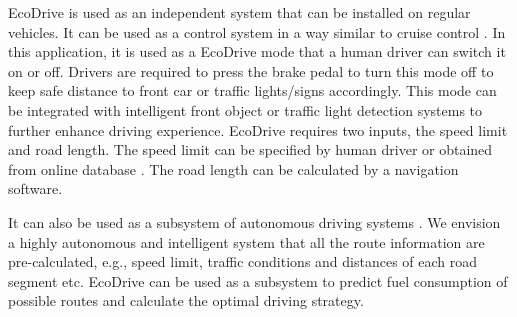 EcoDrive is used as an independent system that can be installed
on regular vehicles.  
It can be used as a control system in a way similar to 
cruise control \cite{cruise_control, bengtsson2001adaptive, ioannou1993autonomous}. 
In this application, it is used as a EcoDrive mode that a human driver
can switch it on or off. 
Drivers are required to press the brake pedal to turn this mode off
to keep safe distance to front car or traffic lights/signs accordingly.
This mode can be integrated with intelligent front object or traffic light detection
systems \cite{bengtsson2001adaptive, ioannou1993autonomous} 
to further enhance driving experience. 
EcoDrive requires two inputs, the speed limit and road length. 
The speed limit can be specified by human driver or obtained from online database \cite{speedlimit}. 
The road length can be calculated by a navigation software.



It can also be used as a subsystem of autonomous driving systems 
\cite{googledriverlesscar, urmson2008autonomous, litman2013autonomous, kim2013towards}. 
We envision a highly autonomous and intelligent system that all the route
information are pre-calculated, e.g., speed limit, traffic conditions and
distances of each road segment etc. 
EcoDrive can be used as a subsystem to predict fuel consumption
of possible routes \cite{ganti2010greengps} and 
calculate the optimal driving strategy.  




